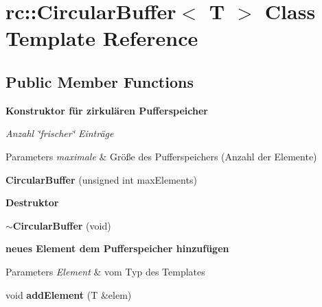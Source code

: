 \hypertarget{classrc_1_1CircularBuffer}{\section{rc\+:\+:Circular\+Buffer$<$ T $>$ Class Template Reference}
\label{classrc_1_1CircularBuffer}
}
\subsection*{Public Member Functions}
\begin{Indent}{\bf Konstruktor für zirkulären Pufferspeicher}\par
{\em Anzahl \char`\"{}frischer\char`\"{} Einträge


\begin{DoxyParams}{Parameters}
{\em maximale} & Größe des Pufferspeichers (Anzahl der Elemente) \\
\hline
\end{DoxyParams}
}\begin{DoxyCompactItemize}
\item 
\hypertarget{classrc_1_1CircularBuffer_af0abd0737caf863845860418e36cee61}{{\bfseries Circular\+Buffer} (unsigned int max\+Elements)}\label{classrc_1_1CircularBuffer_af0abd0737caf863845860418e36cee61}

\end{DoxyCompactItemize}
\end{Indent}
\begin{Indent}{\bf Destruktor}\par
\begin{DoxyCompactItemize}
\item 
\hypertarget{classrc_1_1CircularBuffer_a5d0be18eb4de56cacfcc716c55e55639}{{\bfseries $\sim$\+Circular\+Buffer} (void)}\label{classrc_1_1CircularBuffer_a5d0be18eb4de56cacfcc716c55e55639}

\end{DoxyCompactItemize}
\end{Indent}
\begin{Indent}{\bf neues Element dem Pufferspeicher hinzufügen}\par
{\em 
\begin{DoxyParams}{Parameters}
{\em Element} & vom Typ des Templates \\
\hline
\end{DoxyParams}
}\begin{DoxyCompactItemize}
\item 
\hypertarget{classrc_1_1CircularBuffer_aa03a62fe9deae36e5b83200f9f7a2c24}{void {\bfseries add\+Element} (T \&elem)}\label{classrc_1_1CircularBuffer_aa03a62fe9deae36e5b83200f9f7a2c24}

\end{DoxyCompactItemize}
\end{Indent}
